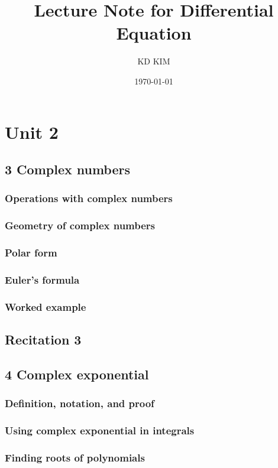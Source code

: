 \documentclass[8pt, a4paper]{article}
\title{Lecture Note for Differential Equation}
\author{KD KIM}
\date{\today}
\begin{document}
\maketitle
\tableofcontents
\clearpage

\section{Unit 2}
\clearpage

\subsection{3 Complex numbers}
\subsubsection{Operations with complex numbers}
\subsubsection{Geometry of complex numbers}
\subsubsection{Polar form}
\subsubsection{Euler's formula}
\subsubsection{Worked example}

\subsection{Recitation 3}

\subsection{4 Complex exponential}
\subsubsection{Definition, notation, and proof}
\subsubsection{Using complex exponential in integrals}
\subsubsection{Finding roots of polynomials}
\end{document}
